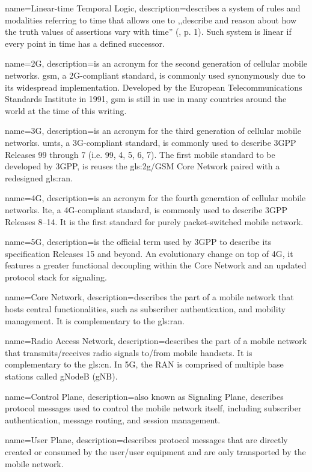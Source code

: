 {
    name={Linear-time Temporal Logic},
    description={describes a system of rules and modalities referring to time that allows one to ,,describe and reason about how the truth values of assertions vary
with time'' (\cite{emerson1990temporal}, p. 1). Such system is linear if every point in time has a defined successor.}
}

{
    name={2G},
    description={is an acronym for the second generation of cellular mobile networks. \gls{gsm}, a 2G-compliant standard, is commonly used synonymously due to its widespread implementation. Developed by the European Telecommunications Standards Institute in 1991, \gls{gsm} is still in use in many countries around the world at the time of this writing.}
}

{
    name={3G},
    description={is an acronym for the third generation of cellular mobile networks. \gls{umts}, a 3G-compliant standard, is commonly used to describe 3GPP Releases 99 through 7 (i.e. 99, 4, 5, 6, 7). The first mobile standard to be developed by 3GPP, is reuses the \gls{gls:2g}/GSM Core Network paired with a redesigned \gls{gls:ran}.}
}

{
    name={4G},
    description={is an acronym for the fourth generation of cellular mobile networks. \gls{lte}, a 4G-compliant standard, is commonly used to describe 3GPP Releases 8--14. It is the first standard for purely packet-switched mobile network.}
}

{
    name={5G},
    description={is the official term used by 3GPP to describe its specification Releases 15 and beyond. An evolutionary change on top of 4G, it features a greater functional decoupling within the Core Network and an updated protocol stack for signaling.}
}

{
    name={Core Network},
    description={describes the part of a mobile network that hosts central functionalities, such as subscriber authentication, and mobility management. It is complementary to the \gls{gls:ran}.}
}

{
    name={Radio Access Network},
    description={describes the part of a mobile network that transmits/receives radio signals to/from mobile handsets. It is complementary to the \gls{gls:cn}. In 5G, the RAN is comprised of multiple base stations called gNodeB (gNB).}
}

{
    name={Control Plane},
    description={also known as Signaling Plane, describes protocol messages used to control the mobile network itself, including subscriber authentication, message routing, and session management.}
}

{
    name={User Plane},
    description={describes protocol messages that are directly created or consumed by the user/user equipment and are only transported by the mobile network.}
}